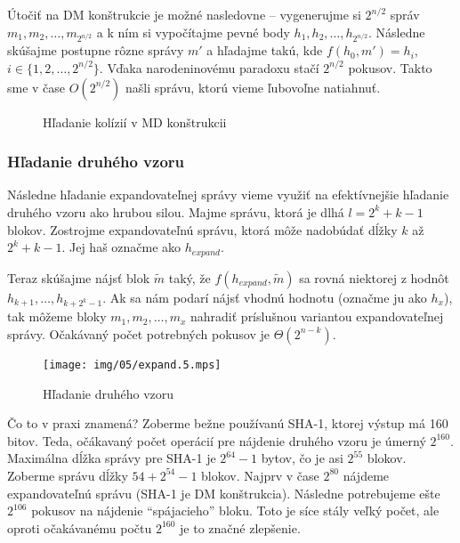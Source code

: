 Útočiť na DM konštrukcie je možné nasledovne -- 
vygenerujme si $2^{n/2}$ správ $m_1, m_2, \dots, m_{2^{n/2}}$
a k ním si vypočítajme pevné body $h_1, h_2, \dots, h_{2^{n/2}}$.
Následne skúšajme postupne rôzne správy $m'$ a hľadajme takú, 
kde $f(h_0, m') = h_i$,$i \in \{1, 2, \dots, 2^{n/2}\}$.
Vďaka narodeninovému paradoxu stačí $2^{n/2}$ pokusov.
Takto sme v čase $O(2^{n/2})$ našli správu, ktorú
vieme ľubovoľne natiahnuť.
\begin{figure}[h!]
    \centering

    \caption{Hľadanie kolízií v MD konštrukcii}
\end{figure}

\subsubsection{Hľadanie druhého vzoru}
Následne hľadanie expandovateľnej správy vieme využiť na efektívnejšie
hľadanie druhého vzoru ako hrubou silou.
Majme správu, ktorá je dlhá $l=2^k + k - 1$ blokov.
Zostrojme expandovateľnú správu, ktorá môže nadobúdať dĺžky $k$
až $2^k + k -1$. Jej haš označme ako $h_{expand}$.

Teraz skúšajme nájsť blok $\tilde{m}$ taký, že $f(h_{expand}, \tilde{m})$ 
sa rovná niektorej z hodnôt $h_{k+1}, \dots, h_{k+2^k-1}$.
Ak sa nám podarí nájsť vhodnú hodnotu
(označme ju ako $h_x$), tak môžeme bloky $m_1, m_2, \dots, m_x$ 
nahradiť príslušnou variantou expandovateľnej správy.
Očakávaný počet potrebných pokusov je $\Theta(2^{n-k})$. 

\begin{figure}[h]
    \centering
    \texttt{[image: img/05/expand.5.mps]}
    \caption{Hľadanie druhého vzoru}
\end{figure}

Čo to v praxi znamená? Zoberme bežne používanú SHA-1, 
ktorej výstup má 160 bitov. Teda,
očákavaný počet operácií pre nájdenie druhého vzoru je úmerný $2^{160}$.
Maximálna dĺžka správy pre SHA-1 je $2^{64} - 1$ bytov,
čo je asi $2^{55}$ blokov.
Zoberme správu dĺžky $54 + 2^{54} - 1$ blokov.
Najprv v čase $2^{80}$ nájdeme expandovateľnú správu (SHA-1 je DM konštrukcia).
Následne potrebujeme ešte $2^{106}$ pokusov na nájdenie 
``spájacieho'' bloku.
Toto je síce stály veľký počet, ale oproti očakávanému počtu $2^{160}$
je to značné zlepšenie.

